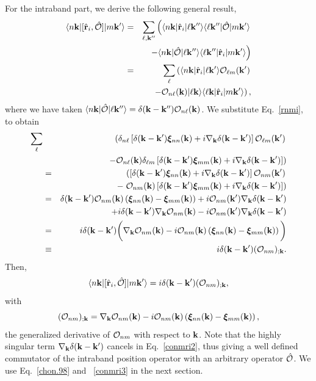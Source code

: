 \documentclass[floatfix,prb,aps,superscriptaddress,11pt,preprint]{revtex4}
\begin{document}
For the intraband part, we derive the following general result,
\begin{eqnarray}\label{conmri}
\langle n\mathbf{k} |[\hat{\mathbf{r}}_i,\hat{{\cal O}}]| m\mathbf{k}' \rangle
&=&
\sum_{\ell,\mathbf{k}''}
\left(
\langle n\mathbf{k} |
\hat{\mathbf{r}}_i
| \ell\mathbf{k}'' \rangle
\langle \ell\mathbf{k}'' |
\hat{{\cal O}}
| m\mathbf{k}' \rangle
\right.
\nonumber \\
&&
\left.
-
\langle n\mathbf{k} |
\hat{{\cal O}}
| \ell\mathbf{k}'' \rangle
\langle \ell\mathbf{k}'' |
\hat{\mathbf{r}}_i
| m\mathbf{k}' \rangle
\right)
\nonumber \\
&=&
\sum_{\ell}
\left(
\langle n\mathbf{k} |
\hat{\mathbf{r}}_i
| \ell\mathbf{k}' \rangle
{\cal O}_{\ell m}(\mathbf{k}')
\right.
\nonumber \\
&&
\left.
-
{\cal O}_{n\ell}(\mathbf{k})
| \ell\mathbf{k} \rangle
\langle \ell\mathbf{k} |
\hat{\mathbf{r}}_i
| m\mathbf{k}' \rangle
\right)
,
\end{eqnarray}
where we have taken
$\langle n\mathbf{k} |\hat{{\cal O}}| \ell\mathbf{k}'' \rangle=\delta(\mathbf{k}-\mathbf{k}''){\cal O}_{n\ell}(\mathbf{k})$.
We substitute Eq.~\eqref{rnmi}, to obtain
\begin{eqnarray}\label{conmri2}
\sum_{\ell}&&
\left(
\delta_{n\ell}\left[\delta(\mathbf{k}-\mathbf{k}')\boldsymbol{\xi}_{nn}(\mathbf{k})
+i\nabla_{\mathbf{k}}\delta(\mathbf{k}-\mathbf{k}')\right]
{\cal O}_{\ell m}(\mathbf{k}')
\right.
\nonumber \\
&&
\left.
-
{\cal O}_{n\ell}(\mathbf{k})
\delta_{\ell m}\left[\delta(\mathbf{k}-\mathbf{k}')\boldsymbol{\xi}_{mm}(\mathbf{k})
+i\nabla_{\mathbf{k}}\delta(\mathbf{k}-\mathbf{k}')\right]
\right)
\nonumber\\
&=&
\left(
\left[\delta(\mathbf{k}-\mathbf{k}')\boldsymbol{\xi}_{nn}(\mathbf{k})
+i\nabla_{\mathbf{k}}\delta(\mathbf{k}-\mathbf{k}')\right]
{\cal O}_{n m}(\mathbf{k}')
\right.
\nonumber \\
&&-
\left.
{\cal O}_{nm}(\mathbf{k})
\left[\delta(\mathbf{k}-\mathbf{k}')\boldsymbol{\xi}_{mm}(\mathbf{k})
+i\nabla_{\mathbf{k}}\delta(\mathbf{k}-\mathbf{k}')\right]
\right)
\nonumber\\
&=&
\delta(\mathbf{k}-\mathbf{k}')
{\cal O}_{nm}(\mathbf{k})
\left(
\boldsymbol{\xi}_{nn}(\mathbf{k})
-
\boldsymbol{\xi}_{mm}(\mathbf{k})
\right)
+i{\cal O}_{n m}(\mathbf{k}')
\nabla_{\mathbf{k}}
\delta(\mathbf{k}-\mathbf{k}')
\nonumber \\
&&+i
\delta(\mathbf{k}-\mathbf{k}')
\nabla_{\mathbf{k}}
{\cal O}_{n m}(\mathbf{k})
-
i{\cal O}_{n m}(\mathbf{k}')
\nabla_{\mathbf{k}}\delta(\mathbf{k}-\mathbf{k}')
\nonumber \\
&=&
i\delta(\mathbf{k}-\mathbf{k}')
\bigg(
\nabla_{\mathbf{k}}
{\cal O}_{n m}(\mathbf{k})
-
i
{\cal O}_{nm}(\mathbf{k})
\left(
\boldsymbol{\xi}_{nn}(\mathbf{k})
-
\boldsymbol{\xi}_{mm}(\mathbf{k})
\right)
\bigg)
\nonumber \\
&\equiv&
i\delta(\mathbf{k}-\mathbf{k}')({\cal O}_{nm})_{;\mathbf{k}}
.
\end{eqnarray}
Then,
\begin{equation}\label{conmri3}
\langle n\mathbf{k} |[\hat{\mathbf{r}}_i,\hat{{\cal O}}]| m\mathbf{k}' \rangle
=i\delta(\mathbf{k}-\mathbf{k}')({\cal O}_{nm})_{;\mathbf{k}}
,
\end{equation}  
with
\begin{equation}\label{gendev}
({\cal O}_{nm})_{;\mathbf{k}}=
\nabla_{\mathbf{k}}
{\cal O}_{n m}(\mathbf{k})
- 
i
{\cal O}_{nm}(\mathbf{k})
\left(
\boldsymbol{\xi}_{nn}(\mathbf{k})
-
\boldsymbol{\xi}_{mm}(\mathbf{k})
\right)
,
\end{equation} 
the generalized derivative of ${\cal O}_{nm}$ with respect to $\mathbf{k}$.
Note that the highly singular term $\nabla_{\mathbf{k}}\delta(\mathbf{k}-\mathbf{k}')$
cancels in Eq.~\eqref{conmri2}, thus giving a well defined commutator
of the intraband position operator with an arbitrary operator $\hat{{\cal O}}$.
We use Eq.~\eqref{chon.98} and ~\eqref{conmri3}  in the next section.
\end{document}
